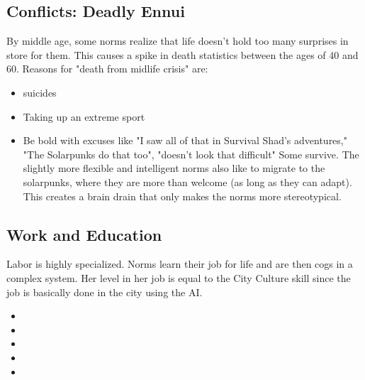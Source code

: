 \subsection{Conflicts: Deadly Ennui}
By middle age, some norms realize that life doesn't hold too many surprises in store for them.
This causes a spike in death statistics between the ages of 40 and 60. Reasons for "death from midlife crisis" are:
\begin{itemize}
    \item suicides
    \item Taking up an extreme sport
    \item Be bold with excuses like "I saw all of that in Survival Shad's adventures," "The Solarpunks do that too", "doesn't look that difficult" Some survive. The slightly more flexible and intelligent norms also like to migrate to the solarpunks, where they are more than welcome (as long as they can adapt). This creates a brain drain that only makes the norms more stereotypical.
\end{itemize}

\subsection{Work and Education}
Labor is highly specialized. Norms learn their job for life and are then cogs in a complex system. Her level in her job is equal to the City Culture skill since the job is basically done in the city using the AI.
\begin{normtalk}[title=An example from the life of a Level 3 Architect.]
    \begin{itemize}
        \item {}
        \item {}
        \item {}
        \item {}
        \item {}
    \end{itemize}
\end{normtalk}

